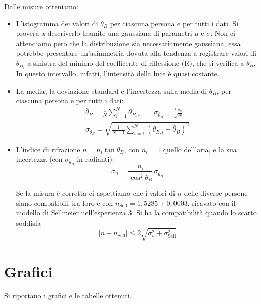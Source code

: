 \documentclass[10pt,twocolumn]{article}
\begin{document}
    \noindent Dalle misure otteniamo:
    \begin{itemize}
      \item L'istogramma dei valori di $\theta_B$ per ciascuna persona e per tutti i dati. Si proverà a descriverlo tramite una gaussiana di parametri $\mu$ e $\sigma$. 
      Non ci attendiamo però che la distribuzione sia necessariamente gaussiana, essa potrebbe presentare un'asimmetria dovuta alla tendenza a registrare valori di $\theta_{B_i}$ a sinistra del minimo del coefficente di riflessione (R), che si verifica a $\theta_B$.
      In questo intervallo, infatti, l'intensità della luce è quasi costante.

      \item La media, la deviazione standard e l'incertezza sulla media di $\theta_B$, per ciascuna persona e per tutti i dati:
   \begin{equation}
  \begin{gathered}
    \bar{\theta}_B = \frac{1}{N}\sum_{i=1}^{N}\theta_{B,i} \qquad \sigma_{\bar{\theta}_B} = \frac{\sigma_{\theta_B}}{\sqrt{N}} \\[6pt]
    \sigma_{\theta_B} = \sqrt{\frac{1}{N-1}\sum_{i=1}^{N}(\theta_{B,i} - \bar{\theta}_B)^2}
  \end{gathered}
  \label{eq:stat}
\end{equation}

      \item L'indice di rifrazione $n = n_i\tan\bar\theta_B$, con $n_i = 1$ quello dell'aria, e la sua incertezza (con $\sigma_{\bar\theta_B}$ in radianti):
      \begin{equation}
    \sigma_n = \frac{n_i}{\cos^2\bar\theta_B}\,\sigma_{\bar\theta_B}        \label{eq:sigman}
      \end{equation}

      \noindent Se la misura è corretta ci aspettiamo che i valori di $n$ delle diverse persone siano compatibili tra loro e con $n_{\mathrm{Sell}} = 1{,}5285 \pm 0{,}0003$, ricavato con il modello di Sellmeier nell'esperienza 3. 
      Si ha la compatibilità quando lo scarto soddisfa
      \begin{equation}
        |n - n_{\mathrm{Sell}}| \leq 2\sqrt{\sigma_n^2 + \sigma_{\mathrm{Sell}}^2}
        \label{eq:comp}
      \end{equation}
      
    \end{itemize}


  \section{Grafici}
    Si riportano i grafici e le tabelle ottenuti.
\end{document}
